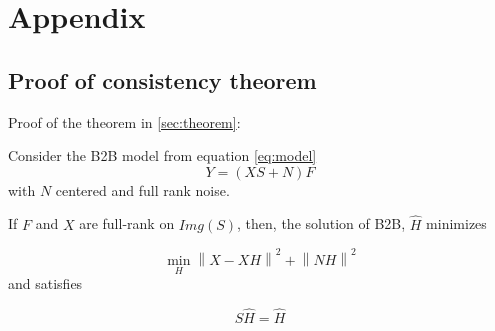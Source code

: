 \newpage
\appendix
\section{Appendix}

\subsection{Proof of consistency theorem}
\label{appendix:theorem_proof}

Proof of the theorem in \ref{sec:theorem}:


\begin{theorem}

     Consider the B2B model from equation \ref{eq:model} $$Y = (XS + N)F$$ with
     $N$ centered and full rank noise.

     If $F$ and $X$ are full-rank on $Img(S)$, then, the solution of B2B, $\hat
     H$ minimizes

     $$\min_H  \left \| X - XH\right\| ^2  + \left \| NH\right \| ^2$$ and satisfies

     $$S\hat H = \hat H$$
\end{theorem}
